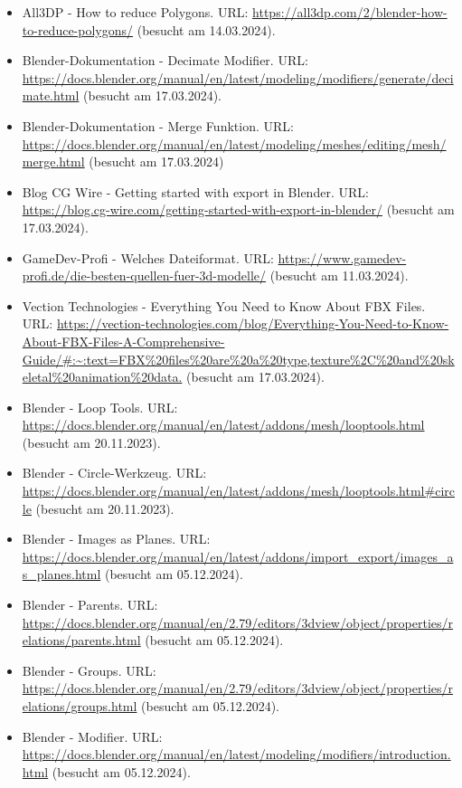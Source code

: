 \begin{itemize}[leftmargin=0pt]
    \item All3DP - How to reduce Polygons. {\scriptsize URL:} \url{https://all3dp.com/2/blender-how-to-reduce-polygons/} (besucht am 14.03.2024).
    \item Blender-Dokumentation - Decimate Modifier. {\scriptsize URL:} \url{https://docs.blender.org/manual/en/latest/modeling/modifiers/generate/decimate.html} (besucht am 17.03.2024).
    \item Blender-Dokumentation - Merge Funktion. {\scriptsize URL:} \url{https://docs.blender.org/manual/en/latest/modeling/meshes/editing/mesh/merge.html} (besucht am 17.03.2024)
    \item Blog CG Wire - Getting started with export in Blender. {\scriptsize URL:} \url{https://blog.cg-wire.com/getting-started-with-export-in-blender/} (besucht am 17.03.2024).
    \item GameDev-Profi - Welches Dateiformat. {\scriptsize URL:} \url{https://www.gamedev-profi.de/die-besten-quellen-fuer-3d-modelle/} (besucht am 11.03.2024).
    \item Vection Technologies - Everything You Need to Know About FBX Files. {\scriptsize URL:} \url{https://vection-technologies.com/blog/Everything-You-Need-to-Know-About-FBX-Files-A-Comprehensive-Guide/#:~:text=FBX%20files%20are%20a%20type,texture%2C%20and%20skeletal%20animation%20data.} (besucht am 17.03.2024).
    \item Blender - Loop Tools. {\scriptsize URL:} \url{https://docs.blender.org/manual/en/latest/addons/mesh/looptools.html} (besucht am 20.11.2023).
    \item Blender - Circle-Werkzeug. {\scriptsize URL:} \url{https://docs.blender.org/manual/en/latest/addons/mesh/looptools.html#circle} (besucht am 20.11.2023).
    \item Blender - Images as Planes. {\scriptsize URL:} \url{https://docs.blender.org/manual/en/latest/addons/import_export/images_as_planes.html} (besucht am 05.12.2024).
    \item Blender - Parents. {\scriptsize URL:} \url{https://docs.blender.org/manual/en/2.79/editors/3dview/object/properties/relations/parents.html} (besucht am 05.12.2024).
    \item Blender - Groups. {\scriptsize URL:} \url{https://docs.blender.org/manual/en/2.79/editors/3dview/object/properties/relations/groups.html} (besucht am 05.12.2024).
    \item Blender - Modifier. {\scriptsize URL:} \url{https://docs.blender.org/manual/en/latest/modeling/modifiers/introduction.html} (besucht am 05.12.2024).

\end{itemize}
